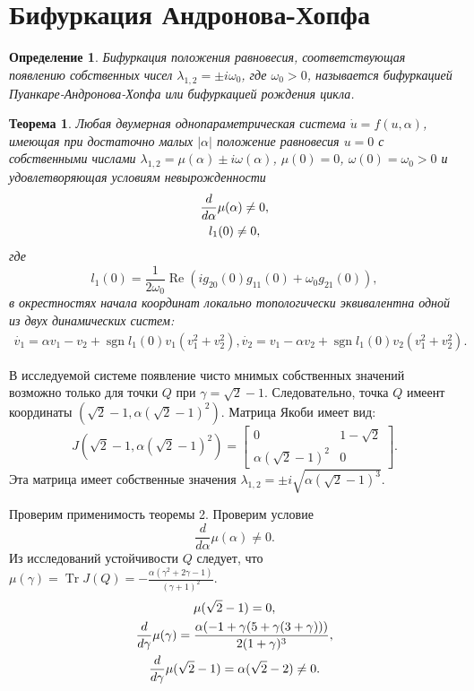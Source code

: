 \documentclass[11pt]{article}
\newtheorem{theorem}{Теорема}
\newtheorem{definition}{Определение}
\newcommand\abs[1]{\left\lvert#1\right\rvert}
\newcommand{\sgn}{\ensuremath{\operatorname{sgn}}}
\newcommand{\Real}{\ensuremath{\operatorname{Re}}}
\DeclareMathOperator{\Tr}{Tr}
\begin{document}
\section{Бифуркация Андронова-Хопфа}
\begin{definition}
Бифуркация положения равновесия, соответствующая появлению собственных чисел $\lambda_{1,2} = \pm i \omega_0$, где $\omega_0 > 0$, называется бифуркацией Пуанкаре-Андронова-Хопфа или бифуркацией рождения цикла.
\end{definition}
\begin{theorem}
Любая двумерная однопараметрическая система $\dot{u} = f(u, \alpha)$, имеющая при достаточно малых $\abs{\alpha}$ положение равновесия $u = 0$ с собственными числами $\lambda_{1,2} = \mu(\alpha) \pm i\omega(\alpha)$, $\mu(0) = 0$, $\omega(0) = \omega_0 > 0$ и удовлетворяющая условиям невырожденности
\begin{gather}
\frac{d}{d\alpha}\mu(\alpha) \neq 0, \notag \\
l_1(0) \neq 0,
\end{gather}
где
$$
l_1(0) = \frac{1}{2\omega_0} \Real(ig_{20}(0)g_{11}(0) + \omega_0g_{21}(0)),
$$
в окрестностях начала координат локально топологически эквивалентна одной из двух динамических систем:
\begin{gather}
\dot{v_1} = \alpha v_1 - v_2 + \sgn l_1(0)v_1(v_1^2 + v_2^2),
\dot{v_2} = v_1 - \alpha v_2 + \sgn l_1(0)v_2(v_1^2 + v_2^2).
\end{gather}
\end{theorem}

В исследуемой системе появление чисто мнимых собственных значений возможно только для точки $Q$ при $\gamma = \sqrt{2} - 1$. Следовательно, точка $Q$ имеент координаты $\left( \sqrt{2} - 1, \alpha(\sqrt{2} - 1)^2 \right)$. Матрица Якоби имеет вид:
$$
J(\sqrt{2} - 1, \alpha(\sqrt{2} - 1)^2) = \left[ \begin{array}{ccc}
0 & 1 - \sqrt{2} \\[0.5em]
\alpha(\sqrt{2} - 1)^2 & 0
\end{array} \right].
$$
Эта матрица имеет собственные значения $\lambda_{1,2} = \pm i \sqrt{\alpha(\sqrt{2} - 1)^3}$.

Проверим применимость теоремы 2. Проверим условие
$$
\frac{d}{d\alpha}\mu(\alpha) \neq 0.
$$
Из исследований устойчивости $Q$ следует, что $\mu(\gamma) = \Tr J(Q) = -\frac{\alpha(\gamma^2 + 2\gamma - 1)}{(\gamma + 1)^2}$.
\begin{gather}
\mu(\sqrt{2} - 1) = 0, \notag \\
\frac{d}{d\gamma}\mu(\gamma) = \frac{\alpha(-1 + \gamma(5 + \gamma(3 + \gamma)))}{2(1 + \gamma)^3}, \notag \\
\frac{d}{d\gamma}\mu(\sqrt{2} - 1) = \alpha(\sqrt{2} - 2) \neq 0. \notag
\end{gather}
\end{document}
